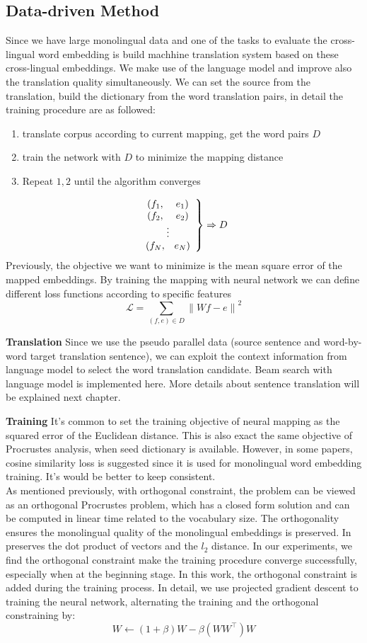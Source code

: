 \subsection{Data-driven Method}
Since we have large monolingual data and one of the tasks to evaluate the cross-lingual word embedding is build machhine translation system based on these cross-lingual embeddings. We make use of the language model and improve also the translation quality simultaneously. We can set the source from the translation, build the dictionary from the word translation pairs, in detail the training procedure are as followed:
\begin{enumerate}
	\item translate corpus according to current mapping, get the word pairs $D$
	\item train the network with $D$ to minimize the mapping distance
	\item Repeat $1,2$ until the algorithm converges
\end{enumerate}
		\[ 
		\left. \begin{array}{c c} 
		(f_1,& e_1)\\
		(f_2,& e_2)\\
		\multicolumn{2}{c}{\vdots}\\
		(f_N,& e_N)
		\end{array} \right\} 
		\Rightarrow D
		\]
Previously, the objective we want to minimize is the mean square error of the mapped embeddings. By training the mapping with neural network we can define different loss functions according to specific features
		\[\mathcal{L} = \sum_{(f,e)\in D} {\lVert Wf - e \rVert}^2  \]


\textbf{Translation}
Since we use the pseudo parallel data (source sentence and word-by-word target translation sentence), we can exploit the context information from language model to select the word translation candidate. Beam search with language model is implemented here. More details about sentence translation will be explained next chapter.


\textbf{Training}
It's common to set the training objective of neural mapping as the squared error of the Euclidean distance. This is also exact the same objective of Procrustes analysis, when seed dictionary is available. However, in some papers, cosine similarity loss is suggested since it is used for monolingual word embedding training. It's would be better to keep consistent.  \\
As mentioned previously, with orthogonal constraint, the problem can be viewed as an orthogonal Procrustes problem, which has a closed form solution and can be computed in linear time related to the vocabulary size. The orthogonality ensures the monolingual quality of the monolingual embeddings is preserved. In preserves the dot product of vectors and the $l_2$ distance.  In our experiments, we find the orthogonal constraint make the training procedure converge successfully, especially when at the beginning stage.
In this work, the orthogonal constraint is added during the training process. In detail, we use projected gradient descent to training the neural network, alternating the training and the orthogonal constraining by:
\[ W \leftarrow (1+\beta) W - \beta(WW^\top)W\]

